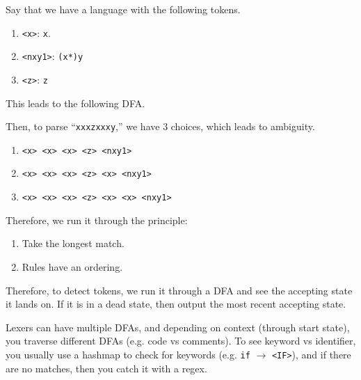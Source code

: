   \begin{example}
    Say that we have a language with the following tokens. 
    \begin{enumerate}
      \item \texttt{<x>}: \texttt{x}. 
      \item \texttt{<nxy1>}: \texttt{(x*)y} 
      \item \texttt{<z>}: \texttt{z}
    \end{enumerate}
    This leads to the following DFA. 

    \begin{figure}[H]
      \centering 
      \caption{} 
      \label{fig:}
    \end{figure}

    Then, to parse ``\texttt{xxxzxxxy},'' we have 3 choices, which leads to ambiguity. 
    \begin{enumerate}
      \item \texttt{<x> <x> <x> <z> <nxy1>}
      \item \texttt{<x> <x> <x> <z> <x> <nxy1>}
      \item \texttt{<x> <x> <x> <z> <x> <x> <nxy1>}
    \end{enumerate}
  \end{example}

  Therefore, we run it through the principle:
  \begin{enumerate}
    \item Take the longest match. 
    \item Rules have an ordering. 
  \end{enumerate}

  Therefore, to detect tokens, we run it through a DFA and see the accepting state it lands on. If it is in a dead state, then output the most recent accepting state. 

  Lexers can have multiple DFAs, and depending on context (through start state), you traverse different DFAs (e.g. code vs comments). To see keyword vs identifier, you usually use a hashmap to check for keywords (e.g. \texttt{if} $\to$ \texttt{<IF>}), and if there are no matches, then you catch it with a regex. 

  
